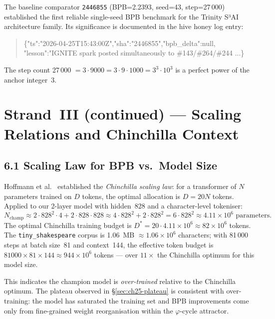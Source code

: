 The baseline comparator \texttt{2446855} (BPB=2.2393, seed=43,
step=27\,000) established the first reliable single-seed BPB
benchmark for the Trinity S³AI architecture family.  Its
significance is documented in the hive honey log entry:
\begin{quote}\footnotesize\ttfamily
\{"ts":"2026-04-25T15:43:00Z","sha":"2446855","bpb\_delta":null,
 "lesson":"IGNITE spark posted simultaneously to \#143/\#264/\#244 ...\}
\end{quote}
The step count 27\,000 $= 3 \cdot 9000 = 3 \cdot 9 \cdot 1000 = 3^3 \cdot 10^3$
is a perfect power of the anchor integer~3.

\section{Strand~III (continued) — Scaling Relations and Chinchilla Context}
\label{sec:ch25-scaling}

\subsection{6.1 Scaling Law for BPB vs.\ Model Size}
\label{subsec:ch25-scaling-law}

Hoffmann et al.\ \citep{hoffmann_chinchilla_2022} established the
\emph{Chinchilla scaling law}: for a transformer of $N$ parameters
trained on $D$ tokens, the optimal allocation is
$D = 20N$ tokens.  Applied to our 2-layer model with hidden~828
and a character-level tokeniser:
\[
  N_{\text{champ}} \approx 2 \cdot 828^2 \cdot 4 + 2 \cdot 828 \cdot 828
  \approx 4 \cdot 828^2 + 2 \cdot 828^2 = 6 \cdot 828^2
  \approx 4.11 \times 10^6 \text{ parameters}.
\]
The optimal Chinchilla training budget is $D^* = 20 \cdot 4.11 \times 10^6
\approx 82 \times 10^6$ tokens.  The \texttt{tiny\_shakespeare} corpus
is 1.06~MB $\approx 1.06\times 10^6$ characters; with 81\,000 steps at
batch size~81 and context~144, the effective token budget is
$81000 \times 81 \times 144 \approx 944 \times 10^6$ tokens — over
$11\times$ the Chinchilla optimum for this model size.

This indicates the champion model is \emph{over-trained} relative to
the Chinchilla optimum.  The plateau observed in
§\ref{sec:ch25-plateau} is consistent with over-training: the model
has saturated the training set and BPB improvements come only from
fine-grained weight reorganisation within the $\varphi$-cycle attractor.

